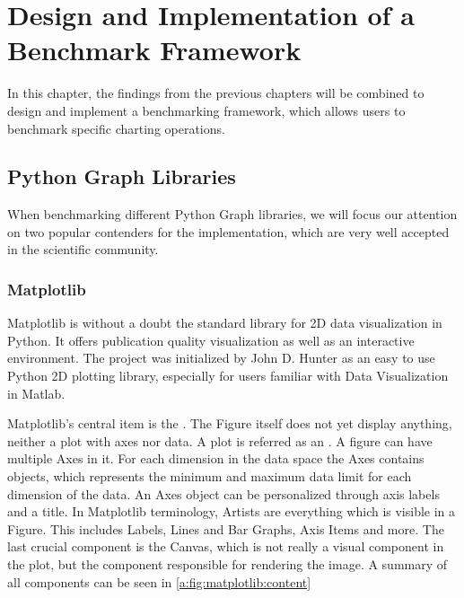 

\chapter{Design and Implementation of a Benchmark Framework}
\label{ch:application}

In this chapter, the findings from the previous chapters will be combined to
design and implement a benchmarking framework, which allows users to
benchmark specific charting operations. 



\section{Python Graph Libraries} \label{sec:application:libraries}

When benchmarking different Python Graph libraries, we will focus our attention
on two popular contenders for the implementation, which are very well accepted
in the scientific community.

\subsection{Matplotlib} \label{sec:application:libraries:matplotlib}

Matplotlib is without a doubt the standard library for 2D data visualization in
Python. It offers publication quality visualization as well as an interactive
environment. The project was initialized by John D. Hunter as an easy to use
Python 2D plotting library, especially for users familiar with Data
Visualization in Matlab.
\cite{Matplotlib, MatplotlibHistory}

Matplotlib's central item is the .
The Figure itself does not yet display anything, neither a plot with axes nor
data. A plot is referred as an . A
figure can have multiple Axes in it. For each dimension in the data space the
Axes contains  objects, which
represents the minimum and maximum data limit for each dimension of the data. An
Axes object can be personalized through axis labels and a title. In Matplotlib
terminology, Artists are everything which is visible in a Figure. This includes
Labels, Lines and Bar Graphs, Axis Items and more. The last crucial component is
the Canvas, which is not really a visual component in the plot, but the
component responsible for rendering the image. A summary of all components can
be seen in \ref{a:fig:matplotlib:content}

